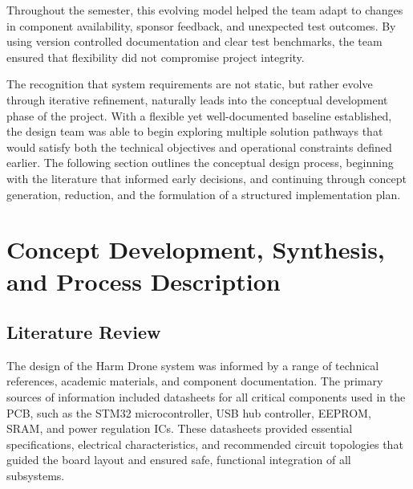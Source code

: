 \documentclass[12pt]{article}
\begin{document}
\par Throughout the semester, this evolving model helped the team adapt to changes in component availability, sponsor feedback, and unexpected test outcomes. By using version controlled documentation and clear test benchmarks, the team ensured that flexibility did not compromise project integrity.

\par The recognition that system requirements are not static, but rather evolve through iterative refinement, naturally leads into the conceptual development phase of the project. With a flexible yet well-documented baseline established, the design team was able to begin exploring multiple solution pathways that would satisfy both the technical objectives and operational constraints defined earlier. The following section outlines the conceptual design process, beginning with the literature that informed early decisions, and continuing through concept generation, reduction, and the formulation of a structured implementation plan.


\section{Concept Development, Synthesis, and Process Description}
\subsection{Literature Review}
The design of the Harm Drone system was informed by a range of technical references, academic materials, and component documentation. The primary sources of information included datasheets for all critical components used in the PCB, such as the STM32 microcontroller, USB hub controller, EEPROM, SRAM, and power regulation ICs. These datasheets provided essential specifications, electrical characteristics, and recommended circuit topologies that guided the board layout and ensured safe, functional integration of all subsystems.
\end{document}
